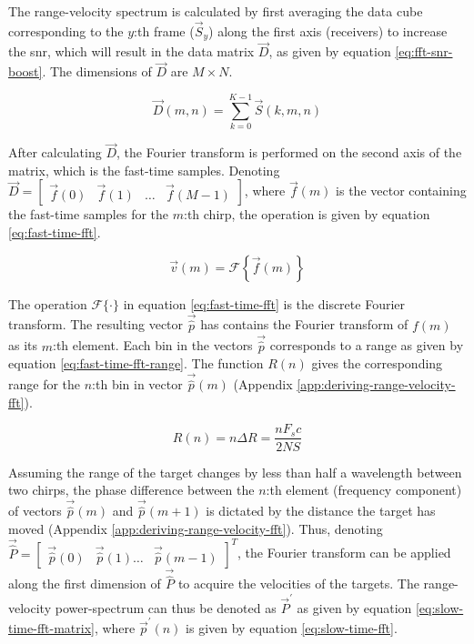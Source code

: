 The range-velocity spectrum is calculated by first averaging the data
cube corresponding to the $y$:th frame ($\vec{S}_{y}$)
along the first axis (receivers) to increase the \gls{snr},
which will result in the data matrix $\vec{D}$, as given by equation \ref{eq:fft-snr-boost}.
The dimensions of $\vec{D}$ are $M \times N$.

\begin{equation}
    \label{eq:fft-snr-boost}
    \vec{D}(m, n) = \sum \limits_{k = 0}^{K-1} \vec{S}(k, m, n)
\end{equation}

After calculating $\vec{D}$, the Fourier transform is performed on the second axis of the matrix,
which is the fast-time samples. Denoting $\vec{D} = \begin{bmatrix} \vec{f}(0) & \vec{f}(1) & \ldots & \vec{f}(M-1) \end{bmatrix}$,
where $\vec{f}(m)$ is the vector containing the fast-time samples for the $m$:th chirp,
the operation is given by equation \ref{eq:fast-time-fft}.

\begin{equation}
    \label{eq:fast-time-fft}
    \vec{v}(m) = \mathcal{F} \left\{ \vec{f}(m) \right\}
\end{equation}

The operation $\mathcal{F} \{ \cdot \}$ in equation \ref{eq:fast-time-fft} is the discrete Fourier transform.
The resulting vector $\vec{\hat p}$ has contains the Fourier transform of $f(m)$ as its $m$:th element.
Each bin in the vectors $\vec{\hat p}$ corresponds to a range as given by equation \ref{eq:fast-time-fft-range}.
The function $R(n)$ gives the corresponding range for the $n$:th bin in vector $\vec{\hat p}(m)$ (Appendix \ref{app:deriving-range-velocity-fft}).

\begin{equation}
    \label{eq:fast-time-fft-range}
    R(n) = n \Delta R = \frac{n F_{s} c}{2NS}
\end{equation}

Assuming the range of the target changes by less than half a wavelength between two chirps,
the phase difference between the $n$:th element (frequency component) of vectors $\vec{\hat p}(m)$ and $\vec{\hat p}(m+1)$
is dictated by the distance the target has moved (Appendix \ref{app:deriving-range-velocity-fft}).
Thus, denoting $\vec{\hat P} = \begin{bmatrix} \vec{\hat p}(0) & \vec{\hat p}(1) \ldots & \vec{\hat p}(m-1) \end{bmatrix}^T$,
the Fourier transform can be applied along the first dimension of $\vec{\hat P}$ to acquire the velocities of the targets.
The range-velocity power-spectrum can thus be denoted as 
$\vec{P}^{\prime}$ as given by equation \ref{eq:slow-time-fft-matrix},
where $\vec{p}^{\prime}(n)$ is given by equation \ref{eq:slow-time-fft}.

